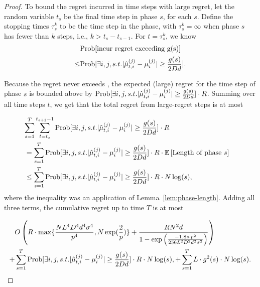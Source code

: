 \begin{proof}
To bound the regret incurred in time steps with large regret,
let the random variable $t_s$ be the final time step in phase $s$,
for each $s$.
Define the stopping times $\tau_{s}^{k}$ to be the 
time step in the  phase,
with $\tau_{s}^{k} = \infty$ when phase $s$ has fewer than $k$ steps,
i.e., $k > t_{s}-t_{s-1}$.
For $t = \tau_{s}^{k}$, we know
\begin{align}
&\Prob{\text{incur regret exceeding g(s)}} \nonumber \\
\leq & \Prob{\exists i,j, s.t. |\ArmE{t}{i}{j} - \Arm{i}{j}|\geq \frac{g(s)}{2\Diam d}}.\nonumber 
\end{align}

Because the regret never exceeds \MAXR,
the expected (large) regret for the  time step of phase $s$
is bounded above by
$\Prob{\exists i,j, s.t. |\ArmE{t}{i}{j} - \Arm{i}{j}|\geq \frac{g(s)}{2\Diam d}} \cdot \MAXR$.
Summing over all time steps $t$, we get that the total regret from
large-regret steps is at most

\begin{align*}
\lefteqn{\sum_{s = 1}^T \sum_{t=t_s}^{t_{s+1}-1}
  \Prob{\exists i,j, s.t. |\ArmE{t}{i}{j} - \Arm{i}{j}|\geq \frac{g(s)}{2\Diam d}} \cdot \MAXR}
\\ & =
\sum_{s = 1}^T 
  \Prob{\exists i,j, s.t. |\ArmE{t}{i}{j} - \Arm{i}{j}|\geq \frac{g(s)}{2\Diam d}} \cdot \MAXR
  \cdot \Expect{\mbox{Length of phase } s}
\\ & \leq
\sum_{s = 1}^T 
 \Prob{\exists i,j, s.t. |\ArmE{t}{i}{j} - \Arm{i}{j}|\geq \frac{g(s)}{2\Diam d}} \cdot \MAXR
  \cdot \ARMNUM \log(s),
\end{align*}
where the inequality was an application of Lemma~\ref{lem:phase-length}.
Adding all three terms,
the cumulative regret up to time $T$ is at most

\begin{align}
&O \left( \MAXR\cdot \max\{\frac{\ARMNUM \TieDensity^4 \Diam^4 d^4 \sigma^4}{\MinProb^4}, N\exp(\frac{2}{p})\}
  + \frac{\MAXR \ARMNUM^2 d}{1 - \exp \left(
    \frac{-1.8 s \cdot \MinProb^2}{256 \TieDensity^2 \Diam^2 d^2 \sigma^2}
  \right)} \right)
\\
+ & \sum_{s = 1}^T 
  \Prob{\exists i,j, s.t. |\ArmE{t}{i}{j} - \Arm{i}{j}|\geq \frac{g(s)}{2\Diam d}} \cdot \MAXR
  \cdot \ARMNUM \log(s),
+ \sum_{s=1}^{T}\TieDensity \cdot g^2(s)\cdot N\log(s). \label{thm:equ}
\end{align}


\end{proof}
